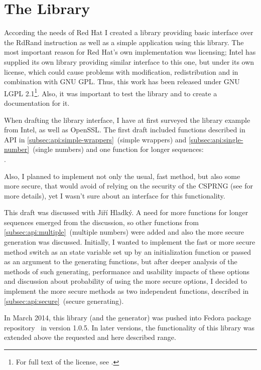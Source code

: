 \chapter{The Library}\label{chap:library}
According the needs of Red Hat I created a library providing basic interface over the RdRand instruction as well as a simple application using this library. The most important reason for Red Hat's own implementation was licensing; Intel has supplied its own library providing similar interface to this one, but under its own license, which could cause problems with modification, redistribution and in combination with GNU GPL. Thus, this work has been released under GNU LGPL 2.1\footnote{For full text of the license, see \cite{GNULGPL}.}. Also, it was important to test the library and to create a documentation for it.

When drafting the library interface, I have at first surveyed the library example from Intel\cite{IntelDRNGGuide}, as well as OpenSSL\cite{OpenSSLAPI}. The first draft included functions described in API in \ref{subsec:api:simple-wrappers}~(simple wrappers) and \ref{subsec:api:single-number}~(single numbers) and one function for longer sequences: \\. 

Also, I planned to implement not only the usual, fast method, but also some more secure, that would avoid of relying on the security of the CSPRNG (see  for more details), yet I wasn't sure about an interface for this functionality.

This draft was discussed with Jiří Hladký. A need for more functions for longer sequences emerged from the discussion, so other functions from \ref{subsec:api:multiple}~(multiple numbers) were added and also the more secure generation was discussed. Initially, I wanted to implement the fast or more secure method switch as an state variable set up by an initialization function or passed as an argument to the generating functions, but after deeper analysis of the methods of such generating, performance and usability impacts of these options and discussion about probability of using the more secure options, I decided to implement the more secure methods as two independent functions, described in \ref{subsec:api:secure}~(secure generating). 

In March 2014, this library (and the generator) was pushed into Fedora package repository~\cite{RdRandFedoraPackage,RdRandFedoraPackageBugzilla} in version 1.0.5. 
In later versions, the functionality of this library was extended above the requested and here described range. 



